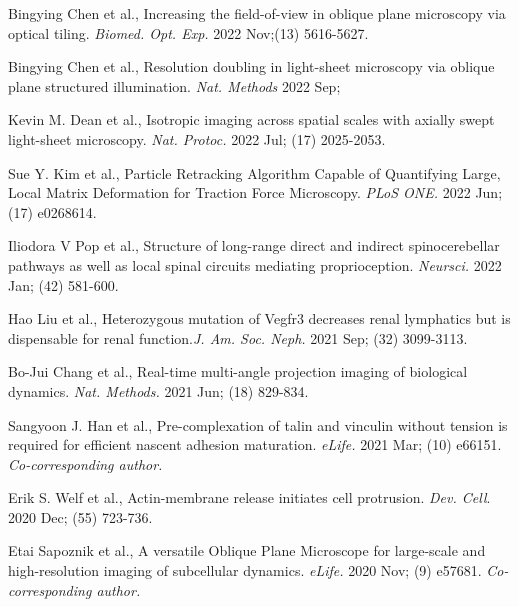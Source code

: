 \documentclass[10pt]{res}
\begin{document}
\begin{resume}
\begin{etaremune}
\item Bingying Chen et al., Increasing the field-of-view in oblique plane microscopy via optical tiling. {\it Biomed. Opt. Exp.} 2022 Nov;(13) 5616-5627.

\item Bingying Chen et al., Resolution doubling in light-sheet microscopy via oblique plane structured illumination. {\it Nat. Methods} 2022 Sep;

\item Kevin M. Dean et al., Isotropic imaging across spatial scales with axially swept light-sheet microscopy. {\it Nat. Protoc.} 2022 Jul; (17) 2025-2053.

\item Sue Y. Kim et al., Particle Retracking Algorithm Capable of Quantifying Large, Local Matrix Deformation for Traction Force Microscopy. {\it PLoS ONE.} 2022 Jun; (17) e0268614. 

\item Iliodora V Pop et al., Structure of long-range direct and indirect spinocerebellar pathways as well as local spinal circuits mediating proprioception. {\it Neursci.} 2022 Jan; (42) 581-600.

\item Hao Liu et al., Heterozygous mutation of Vegfr3 decreases renal lymphatics but is dispensable for renal function.{\it J. Am. Soc. Neph.} 2021 Sep; (32) 3099-3113.

\item Bo-Jui Chang et al., Real-time multi-angle projection imaging of biological dynamics. {\it Nat. Methods.} 2021 Jun; (18) 829-834.

\item Sangyoon J. Han et al., Pre-complexation of talin and vinculin without tension is required for efficient nascent adhesion maturation. {\it eLife.} 2021 Mar; (10) e66151. {\it Co-corresponding author.}

\item Erik S. Welf et al., Actin-membrane release initiates cell protrusion.  {\it Dev. Cell}. 2020 Dec; (55) 723-736.

\item  Etai Sapoznik et al., A versatile Oblique Plane Microscope for large-scale and high-resolution imaging of subcellular dynamics.  {\it eLife.} 2020 Nov; (9) e57681. {\it Co-corresponding author.}


\end{etaremune}
\end{resume}
\end{document}
